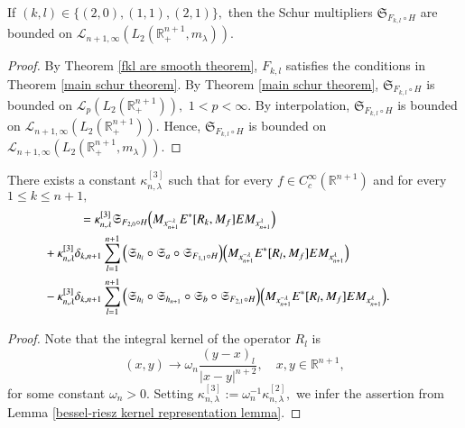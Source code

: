 \documentclass{amsart}
\begin{document}
\begin{lemma}\label{fkl schur lemma} If $(k,l)\in\{(2,0),(1,1),(2,1)\},$ then the Schur multipliers $\mathfrak{S}_{F_{k,l}\circ H}$ are bounded on $\mathcal{L}_{n+1,\infty}(L_2(\mathbb{R}^{n+1}_+,m_{\lambda})).$
\end{lemma}
\begin{proof} By Theorem \ref{fkl are smooth theorem}, $F_{k,l}$ satisfies the conditions in Theorem \ref{main schur theorem}. By Theorem \ref{main schur theorem}, $\mathfrak{S}_{F_{k,l}\circ H}$ is bounded on $\mathcal{L}_p(L_2(\mathbb{R}^{n+1}_+)),$ $1<p<\infty.$ By interpolation,  $\mathfrak{S}_{F_{k,l}\circ H}$ is bounded on $\mathcal{L}_{n+1,\infty}(L_2(\mathbb{R}^{n+1}_+)).$ Hence, $\mathfrak{S}_{F_{k,l}\circ H}$ is bounded on $\mathcal{L}_{n+1,\infty}(L_2(\mathbb{R}^{n+1}_+,m_{\lambda})).$
\end{proof}

\begin{lemma}\label{commutator representation lemma} There exists a constant $\kappa_{n,\lambda}^{[3]}$ such that for every $f\in C^{\infty}_c(\mathbb{R}^{n+1})$ and for every $1\leq k\leq n+1,$
\begin{align*}
[R_{\lambda,k},M_{E^{\ast}f}]&=\kappa_{n,\lambda}^{[3]}\mathfrak{S}_{F_{2,0}\circ H}\Big( M_{x_{n+1}^{-\lambda}} E^{\ast}[R_k,M_{f}]E M_{x_{n+1}^{\lambda}}\Big)\\
&\hspace{-1.0cm}+\kappa_{n,\lambda}^{[3]}\delta_{k,n+1}\sum_{l=1}^{n+1}\Big(\mathfrak{S}_{h_l}\circ\mathfrak{S}_a\circ\mathfrak{S}_{F_{1,1}\circ H}\Big)\Big(M_{x_{n+1}^{-\lambda}} E^{\ast}[R_l,M_{f}]E M_{x_{n+1}^{\lambda}}\Big)\\
&\hspace{-1.0cm}-\kappa_{n,\lambda}^{[3]}\delta_{k,n+1}\sum_{l=1}^{n+1}\Big(\mathfrak{S}_{h_l}\circ\mathfrak{S}_{h_{n+1}}\circ\mathfrak{S}_b\circ\mathfrak{S}_{F_{2,1}\circ H}\Big)\Big( M_{x_{n+1}^{-\lambda}} E^{\ast}[R_l,M_{f}]E M_{x_{n+1}^{\lambda}}\Big).
\end{align*}
\end{lemma}
\begin{proof} Note that the integral kernel of the operator $R_l$ is
$$(x,y)\to\omega_n\frac{(y-x)_l}{|x-y|^{n+2}},\quad x,y\in\mathbb{R}^{n+1},$$
for some constant $\omega_{n}>0.$ Setting $\kappa_{n,\lambda}^{[3]}:=\omega_n^{-1}\kappa_{n,\lambda}^{[2]},$ we infer the assertion from
Lemma \ref{bessel-riesz kernel representation lemma}.
\end{proof}
\end{document}
